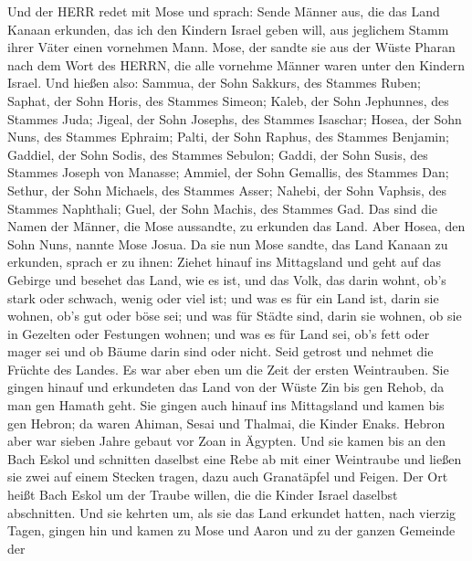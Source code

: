  Und der HERR redet mit Mose und sprach:  Sende
Männer aus, die das Land Kanaan erkunden, das ich den Kindern Israel
geben will, aus jeglichem Stamm ihrer Väter einen vornehmen Mann.
 Mose, der sandte sie aus der Wüste Pharan nach dem Wort des
HERRN, die alle vornehme Männer waren unter den Kindern Israel.
 Und hießen also: Sammua, der Sohn Sakkurs, des Stammes
Ruben;  Saphat, der Sohn Horis, des Stammes Simeon;
 Kaleb, der Sohn Jephunnes, des Stammes Juda; 
Jigeal, der Sohn Josephs, des Stammes Isaschar;  Hosea, der
Sohn Nuns, des Stammes Ephraim;  Palti, der Sohn Raphus, des
Stammes Benjamin;  Gaddiel, der Sohn Sodis, des Stammes
Sebulon;  Gaddi, der Sohn Susis, des Stammes Joseph von
Manasse;  Ammiel, der Sohn Gemallis, des Stammes Dan;
 Sethur, der Sohn Michaels, des Stammes Asser;
 Nahebi, der Sohn Vaphsis, des Stammes Naphthali;
 Guel, der Sohn Machis, des Stammes Gad.  Das
sind die Namen der Männer, die Mose aussandte, zu erkunden das Land.
Aber Hosea, den Sohn Nuns, nannte Mose Josua.  Da sie nun
Mose sandte, das Land Kanaan zu erkunden, sprach er zu ihnen: Ziehet
hinauf ins Mittagsland und geht auf das Gebirge  und
besehet das Land, wie es ist, und das Volk, das darin wohnt, ob's stark
oder schwach, wenig oder viel ist;  und was es für ein Land
ist, darin sie wohnen, ob's gut oder böse sei; und was für Städte sind,
darin sie wohnen, ob sie in Gezelten oder Festungen wohnen;
 und was es für Land sei, ob's fett oder mager sei und ob
Bäume darin sind oder nicht. Seid getrost und nehmet die Früchte des
Landes. Es war aber eben um die Zeit der ersten Weintrauben.
 Sie gingen hinauf und erkundeten das Land von der Wüste
Zin bis gen Rehob, da man gen Hamath geht.  Sie gingen auch
hinauf ins Mittagsland und kamen bis gen Hebron; da waren Ahiman, Sesai
und Thalmai, die Kinder Enaks. Hebron aber war sieben Jahre gebaut vor
Zoan in Ägypten.  Und sie kamen bis an den Bach Eskol und
schnitten daselbst eine Rebe ab mit einer Weintraube und ließen sie zwei
auf einem Stecken tragen, dazu auch Granatäpfel und Feigen.
 Der Ort heißt Bach Eskol um der Traube willen, die die
Kinder Israel daselbst abschnitten.  Und sie kehrten um,
als sie das Land erkundet hatten, nach vierzig Tagen, 
gingen hin und kamen zu Mose und Aaron und zu der ganzen Gemeinde der
